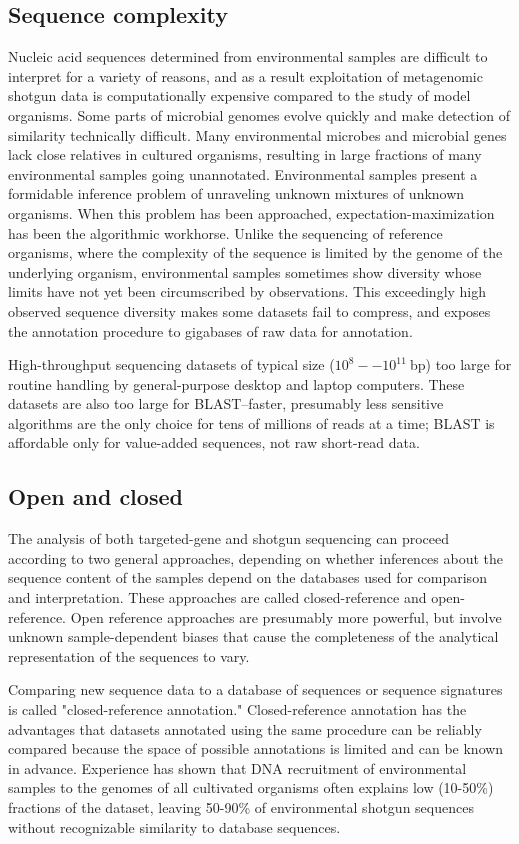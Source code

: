 \documentclass[graybox]{svmult}
\begin{document}
\subsection{Sequence complexity}
Nucleic acid sequences determined from environmental samples are difficult to interpret for a variety of reasons, and as a result exploitation of metagenomic shotgun data is computationally expensive compared to the study of model organisms.
Some parts of microbial genomes evolve quickly and make detection of similarity technically difficult.
Many environmental microbes and microbial genes lack close relatives in cultured organisms, resulting in large fractions of many environmental samples going unannotated.
Environmental samples present a formidable inference problem of unraveling unknown mixtures of unknown organisms.  When this problem has been approached, expectation-maximization has been the algorithmic workhorse.
Unlike the sequencing of reference organisms, where the complexity of the sequence is limited by the genome of the underlying organism, environmental samples sometimes show diversity whose limits have not yet been circumscribed by observations.  This exceedingly high observed sequence diversity makes some datasets fail to compress, and exposes the annotation procedure to gigabases of raw data for annotation.

High-throughput sequencing datasets of typical size ($10^{8}--10^{11}~$bp) too large for routine handling by general-purpose desktop and laptop computers.  These datasets are also too large for BLAST--faster, presumably less sensitive algorithms are the only choice for tens of millions of reads at a time; BLAST is affordable only for value-added sequences, not raw short-read data.

\subsection{Open and closed}
The analysis of both targeted-gene and shotgun sequencing can proceed according to two general approaches, depending on whether inferences about the sequence content of the samples depend on the databases used for comparison and interpretation.  These approaches are called closed-reference and open-reference.  Open reference approaches are presumably more powerful, but involve unknown sample-dependent biases that cause the completeness of the analytical representation of the sequences to vary.

Comparing new sequence data to a database of sequences or sequence signatures is called "closed-reference annotation."  Closed-reference annotation has the advantages that datasets annotated using the same procedure can be reliably compared because the space of possible annotations is limited and can be known in advance.
Experience has shown that DNA recruitment of environmental samples to the genomes of all cultivated organisms often explains low (10-50\%) fractions of the dataset, leaving 50-90\% of environmental shotgun sequences without recognizable similarity to database sequences.
\end{document}
